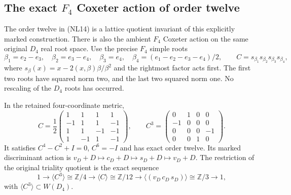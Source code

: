 \subsection{The exact $F_4$ Coxeter action of order twelve}

The order twelve in (NL14) is a lattice quotient invariant of
this explicitly marked construction. There is also the ambient
$F_4$ Coxeter action on the same original $D_4$ real root space.
Use the precise $F_4$ simple roots
\[
 \beta_1=e_2-e_3,\quad\beta_2=e_3-e_4,\quad
 \beta_3=e_4,\quad\beta_4=(e_1-e_2-e_3-e_4)/2,
 \qquad C=s_{\beta_1}s_{\beta_2}s_{\beta_3}s_{\beta_4},
\]
where $s_\beta(x)=x-2(x,\beta)\beta/\beta^2$ and the rightmost
factor acts first. The first two roots have squared norm two,
and the last two squared norm one. No rescaling of the $D_4$
roots has occurred.

\begin{theorem}
\label{esnl:thm:f4-coxeter-twelve}
In the retained four-coordinate metric,
\[
 C=\frac12
 \begin{pmatrix}
 1&1&1&1\\-1&1&1&-1\\1&1&-1&-1\\1&-1&1&-1
 \end{pmatrix},\qquad
 C^3=
 \begin{pmatrix}
 0&1&0&0\\-1&0&0&0\\0&0&0&-1\\0&0&1&0
 \end{pmatrix}.
 \tag{NL19}
\]
It satisfies $C^4-C^2+I=0$, $C^6=-I$ and has exact order
twelve. Its marked discriminant action is
$v_D+D\mapsto c_D+D\mapsto s_D+D\mapsto v_D+D$.
The restriction of the original triality quotient is the exact
sequence
\[
 1\longrightarrow\langle C^3\rangle\cong\mathbb Z/4
 \longrightarrow\langle C\rangle\cong\mathbb Z/12
 \longrightarrow\langle(v_D\,c_D\,s_D)\rangle\cong\mathbb Z/3
 \longrightarrow1,
 \tag{NL20}
\]
with $\langle C^3\rangle\subset W(D_4)$.
\end{theorem}

